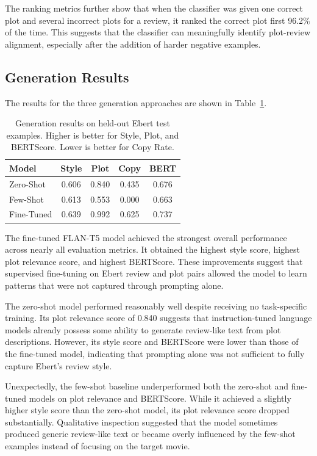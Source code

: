 The ranking metrics further show that when the classifier was given one correct plot and several incorrect plots for a review, it ranked the correct plot first 96.2\% of the time. This suggests that the classifier can meaningfully identify plot-review alignment, especially after the addition of harder negative examples.

\subsection{Generation Results}

The results for the three generation approaches are shown in Table~\ref{tab:generation}.

\begin{table}[h]
\centering
\begin{tabular}{l c c c c}
\hline
\textbf{Model} & \textbf{Style} & \textbf{Plot} & \textbf{Copy} & \textbf{BERT} \\
\hline
Zero-Shot & 0.606 & 0.840 & 0.435 & 0.676 \\
Few-Shot & 0.613 & 0.553 & 0.000 & 0.663 \\
Fine-Tuned & 0.639 & 0.992 & 0.625 & 0.737 \\
\hline
\end{tabular}
\caption{Generation results on held-out Ebert test examples. Higher is better for Style, Plot, and BERTScore. Lower is better for Copy Rate.}
\label{tab:generation}
\end{table}

The fine-tuned FLAN-T5 model achieved the strongest overall performance across nearly all evaluation metrics. It obtained the highest style score, highest plot relevance score, and highest BERTScore. These improvements suggest that supervised fine-tuning on Ebert review and plot pairs allowed the model to learn patterns that were not captured through prompting alone.

The zero-shot model performed reasonably well despite receiving no task-specific training. Its plot relevance score of 0.840 suggests that instruction-tuned language models already possess some ability to generate review-like text from plot descriptions. However, its style score and BERTScore were lower than those of the fine-tuned model, indicating that prompting alone was not sufficient to fully capture Ebert's review style.

Unexpectedly, the few-shot baseline underperformed both the zero-shot and fine-tuned models on plot relevance and BERTScore. While it achieved a slightly higher style score than the zero-shot model, its plot relevance score dropped substantially. Qualitative inspection suggested that the model sometimes produced generic review-like text or became overly influenced by the few-shot examples instead of focusing on the target movie.

